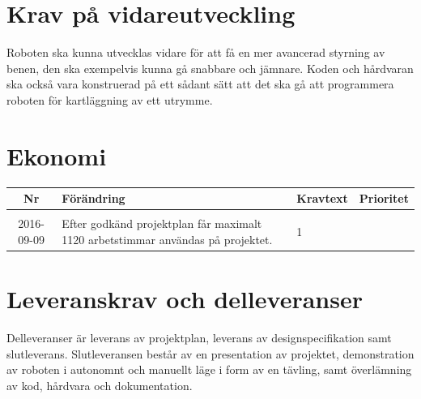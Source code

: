 \documentclass[a4paper,titlepage,12pt]{article}
\newcounter{reqNr}
\newcounter{reqNrII}
\newcommand{\nextReqNrII}{\stepcounter{reqNrII}\arabic{reqNrII}}
\newcommand{\newRequirement}[1] {\pbox{5cm}{Tillagt \\#1}}
\begin{document}
	\section{Krav på vidareutveckling}
	Roboten ska kunna utvecklas vidare för att få en mer avancerad styrning av benen, 
	den ska exempelvis kunna gå snabbare och jämnare. Koden och hårdvaran ska också vara
	konstruerad på ett sådant sätt att det ska gå att programmera roboten för
	kartläggning av ett utrymme.

	\section{Ekonomi}

	\begin{longtable}[c]{ c l>{\raggedright}p{} l }
		\textbf{Nr} & \textbf{Förändring} & \textbf{Kravtext} & \textbf{Prioritet} 
		\\ \midrule
		
		\nextReqNrII{} & \newRequirement{2016-09-09} & Efter godkänd projektplan får
			maximalt 1120 arbetstimmar användas på projektet. & 1
	\end{longtable}

	\section{Leveranskrav och delleveranser}
	Delleveranser är leverans av projektplan, leverans av designspecifikation 
	samt slutleverans. Slutleveransen består av en presentation av projektet, 
	demonstration av roboten i autonomnt och manuellt läge i form av en tävling,
	samt överlämning av kod, hårdvara och dokumentation.
\end{document}
